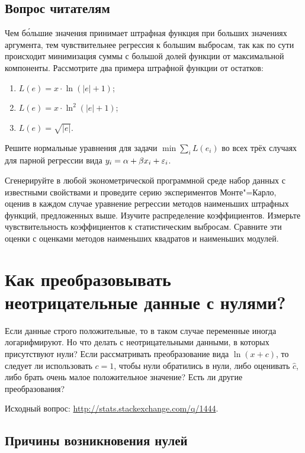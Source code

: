 \documentclass[final,pdftex]{../../template/epsilonj}
\begin{document}
\subsection{Вопрос читателям}

Чем б\'{о}льшие значения принимает штрафная функция при больших значениях аргумента, тем чувствительнее регрессия к большим выбросам, так как по сути происходит минимизация суммы с большой долей функции от максимальной компоненты. Рассмотрите два примера штрафной функции от остатков:
\begin{enumerate}
	\item $L(e) = x\cdot \ln (|e|+1)$;
	\item $L(e) = x\cdot \ln^2 (|e|+1)$;
	\item $L(e) = \sqrt{|e|}$.
\end{enumerate}
Решите нормальные уравнения для задачи $\min \sum\limits_i L(e_i)$ во всех трёх случаях для парной регрессии вида $y_i = \alpha + \beta x_i + \varepsilon_i$. 

Сгенерируйте в любой эконометрической программной среде набор данных с известными свойствами и проведите серию экспериментов Монте"=Карло, оценив в каждом случае уравнение регрессии методов наименьших штрафных функций, предложенных выше. Изучите распределение коэффициентов. Измерьте чувствительность коэффициентов к статистическим выбросам. Сравните эти оценки с оценками методов наименьших квадратов и наименьших модулей.

\section{Как преобразовывать неотрицательные данные с нулями? }

Если данные строго положительные, то в таком случае переменные иногда логарифмируют. Но что делать с неотрицательными данными, в которых присутствуют нули? Если рассматривать преобразование вида $\ln (x+c)$, то следует ли использовать $c=1$, чтобы нули обратились в нули, либо оценивать $\hat c$, либо брать очень малое положительное значение? Есть ли другие преобразования?

Исходный вопрос: \url{http://stats.stackexchange.com/q/1444}.

\subsection{Причины возникновения нулей}
\end{document}
